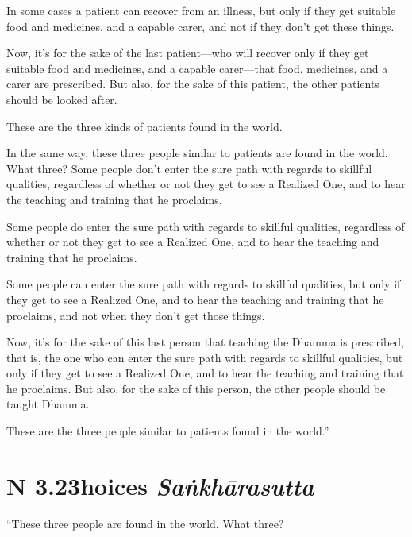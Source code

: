 \documentclass[12pt,openany]{book}%
\newcommand*{\suttatitleacronym}[1]{\smaller[2]{#1}\vspace*{.3em}}
\newcommand*{\suttatitletranslation}[1]{\linebreak{#1}}
\newcommand*{\suttatitleroot}[1]{\linebreak\smaller[2]\itshape{#1}}
\newcommand*{\tocacronym}[1]{\hspace*{-3.3em}{#1}\quad}
\newcommand*{\toctranslation}[1]{#1}
\newcommand*{\tocroot}[1]{(\textit{#1})}
\begin{document}
In some cases a patient can recover from an illness, but only if they get suitable food and medicines, and a capable carer, and not if they don’t get these things. 

Now, it’s for the sake of the last patient—who will recover only if they get suitable food and medicines, and a capable carer—that food, medicines, and a carer are prescribed. But also, for the sake of this patient, the other patients should be looked after. 

These are the three kinds of patients found in the world. 

In the same way, these three people similar to patients are found in the world. What three? Some people don’t enter the sure path with regards to skillful qualities, regardless of whether or not they get to see a Realized One, and to hear the teaching and training that he proclaims. 

Some people do enter the sure path with regards to skillful qualities, regardless of whether or not they get to see a Realized One, and to hear the teaching and training that he proclaims. 

Some people can enter the sure path with regards to skillful qualities, but only if they get to see a Realized One, and to hear the teaching and training that he proclaims, and not when they don’t get those things. 

Now, it’s for the sake of this last person that teaching the Dhamma is prescribed, that is, the one who can enter the sure path with regards to skillful qualities, but only if they get to see a Realized One, and to hear the teaching and training that he proclaims. But also, for the sake of this person, the other people should be taught Dhamma. 

These are the three people similar to patients found in the world.” 

%
\section*{{\suttatitleacronym AN 3.23}{\suttatitletranslation Choices }{\suttatitleroot Saṅkhārasutta}}
\addcontentsline{toc}{section}{\tocacronym{AN 3.23} \toctranslation{Choices } \tocroot{Saṅkhārasutta}}

“These three people are found in the world. What three? 
\end{document}
